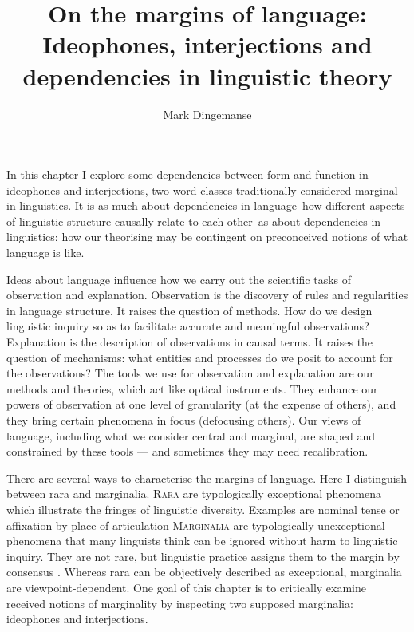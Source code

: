 \documentclass[output=paper]{langsci/langscibook}
\author{Mark Dingemanse\affiliation{MPI for Psycholinguistics, Nijmegen}}
\title{On the margins of language: Ideophones, interjections and dependencies in linguistic theory}
\begin{document}
\maketitle

  
\noindent In this chapter I explore some dependencies between form and function in ideophones and interjections, two word classes traditionally considered marginal in linguistics. It is as much about dependencies in language--how different aspects of linguistic structure causally relate to each other--as about dependencies in linguistics: how our theorising may be contingent on preconceived notions of what language is like. 


Ideas about language influence how we carry out the scientific tasks of observation and explanation. Observation is the discovery of rules and regularities in language structure. It raises the question of methods. How do we design linguistic inquiry so as to facilitate accurate and meaningful observations? Explanation is the description of observations in causal terms. It raises the question of mechanisms: what entities and processes do we posit to account for the observations? The tools we use for observation and explanation are our methods and theories, which act like optical instruments. They enhance our powers of observation at one level of granularity (at the expense of others), and they bring certain phenomena in focus (defocusing others). Our views of language, including what we consider central and marginal, are shaped and constrained by these tools — and sometimes they may need recalibration.



  There are several ways to characterise the margins of language. Here I distinguish between rara and marginalia. \textsc{Rara} are typologically exceptional phenomena which illustrate the fringes of linguistic diversity. Examples are nominal tense or affixation by place of articulation \citep{Wohlgemuth2010} \textsc{Marginalia} are typologically unexceptional phenomena that many linguists think can be ignored without harm to linguistic inquiry. They are not rare, but linguistic practice assigns them to the margin by consensus \citep{Joseph1997}. Whereas rara can be objectively described as exceptional, marginalia are viewpoint-dependent. One goal of this chapter is to critically examine received notions of marginality by inspecting two supposed marginalia: ideophones and interjections.   
\end{document}

